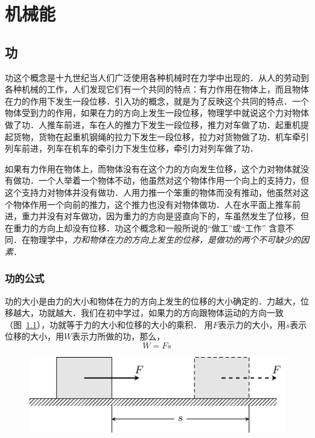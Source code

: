 \chapter{机械能}\label{chapter-mechanical-energy}

\section{功}
功这个概念是十九世纪当人们广泛使用各种机械时在力学中出现的．从人的劳动到各种机械的工作，人们发现它们有一个共同的特点：有力作用在物体上，而且物体在力的作用下发生一段位移．引入功的概念，就是为了反映这个共同的特点．一个物体受到力的作用，如果在力的方向上发生一段位移，物理学中就说这个力对物体做了功．人推车前进，车在人的推力下发生一段位移，推力对车做了功．起重机提起货物，货物在起重机钢绳的拉力下发生一段位移，拉力对货物做了功．机车牵引列车前进，列车在机车的牵引力下发生位移，牵引力对列车做了功．

如果有力作用在物体上，而物体没有在这个力的方向发生位移，这个力对物体就没有做功．一个人举着一个物体不动，他虽然对这个物体作用一个向上的支持力，但这个支持力对物体并没有做功．人用力推一个笨重的物体而没有推动，他虽然对这个物体作用一个向前的推力，这个推力也没有对物体做功．人在水平面上推车前进，重力并没有对车做功，因为重力的方向是竖直向下的，车虽然发生了位移，但在重力的方向上却没有位移．功这个概念和一般所说的“做工”或“工作”
含意不同．在物理学中，\textit{力和物体在力的方向上发生的位移，是做功的两个不可缺少的因素}．

\subsection{功的公式}

功的大小是由力的大小和物体在力的方向上发生的位移的大小确定的．力越大，位移越大，功就越大．我们在初中学过，如果力的方向跟物体运动的方向一致（图~\ref{fig_A_7-1}），功就等于力的大小和位移的大小的乘积．
用$F$表示力的大小，用$s$表示位移的大小，用$W$表示力所做的功，那么，
\[W=Fs\]

\begin{figure}[htbp]
    \centering
    \includegraphics{fig/A/7-1.pdf}
    \caption{}\label{fig_A_7-1}
\end{figure}

